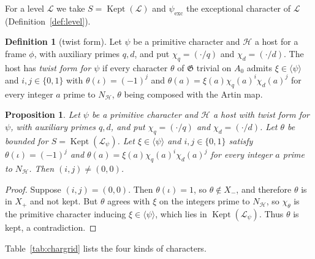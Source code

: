 \documentclass[11pt]{amsbook}
\theoremstyle{plain}
\newtheorem{proposition}[theorem]{Proposition}
\theoremstyle{definition}
\newtheorem{definition}[theorem]{Definition}
\theoremstyle{remark}
\numberwithin{equation}{section}
\numberwithin{figure}{chapter}
\numberwithin{table}{chapter}
\newcommand{\lev}{\mathscr{L}}
\newcommand{\Kept}{\operatorname{Kept}}
\newcommand{\GG}{\mathfrak{G}}
\begin{document}
For a level $\lev$ we take $S=\Kept(\lev)$ and $\psi_{\mathrm{exc}}$
the exceptional character of $\lev$
(Definition~\ref{def:level}).

\begin{definition}[twist form]\label{def:twistform}
Let $\psi$ be a primitive character and $\mathcal H$ a host for a frame
$\phi$, with auxiliary primes $q,d$, and put $\chi_q=(\cdot/q)$ and
$\chi_d=(\cdot/d)$. The host has \emph{twist form for $\psi$} if every
character
$\theta$ of $\GG$ trivial on $A_0$ admits $\xi\in\langle\psi\rangle$
and $i,j\in\{0,1\}$ with $\theta(\iota)=(-1)^j$ and
$\theta(a)=\xi(a)\chi_q(a)^i\chi_d(a)^j$ for every integer $a$ prime
to $N_{\mathcal H}$, $\theta$ being composed with the Artin map.
\end{definition}

\begin{proposition}\label{prop:bounded-twists}
Let $\psi$ be a primitive character and $\mathcal H$ a host with twist
form for $\psi$, with auxiliary primes $q,d$, and put
$\chi_q=(\cdot/q)$ and $\chi_d=(\cdot/d)$. Let $\theta$ be bounded for
$S=\Kept(\lev_\psi)$.
Let $\xi\in\langle\psi\rangle$ and $i,j\in\{0,1\}$ satisfy
$\theta(\iota)=(-1)^j$ and $\theta(a)=\xi(a)\chi_q(a)^i\chi_d(a)^j$
for every integer $a$ prime to $N_{\mathcal H}$. Then
$(i,j)\ne(0,0)$.
\end{proposition}

\begin{proof}
Suppose $(i,j)=(0,0)$. Then $\theta(\iota)=1$, so $\theta\notin X_-$,
and therefore $\theta$ is in $X_+$ and not kept. But $\theta$ agrees
with $\xi$ on the integers prime to $N_{\mathcal H}$, so
$\chi_\theta$ is the primitive character inducing
$\xi\in\langle\psi\rangle$, which lies in $\Kept(\lev_\psi)$. Thus
$\theta$ is kept, a contradiction.
\end{proof}

Table~\ref{tab:chargrid} lists the four kinds of characters.

\begin{table}[htbp]
\centering

\caption{Characters $\theta$ of $\GG$ trivial on $A_0$, for a host with
twist form for $\psi$. Each is $\xi\chi_q^i\chi_d^j$ with
$\xi\in\langle\psi\rangle$ and $\theta(\iota)=(-1)^j$
(Definition~\ref{def:twistform}). By
Proposition~\ref{prop:bounded-twists} a bounded character has
$(i,j)\ne(0,0)$. Conversely, $(0,1)$ and $(1,1)$ are bounded because
$\theta(\iota)=-1$, and $(1,0)$ is bounded when $q\nmid N_\psi$, since
it is then not kept (Definition~\ref{def:bounded}). The bounded
characters are controlled by the pointwise bound at the test scale,
clause~\ref{item:gp-pointwise} of a good pair (Definition~\ref{def:good-pair});
for real
twists, clause~\ref{item:gp-box} adds a zero-free box.}
\label{tab:chargrid}
\end{table}
\end{document}
